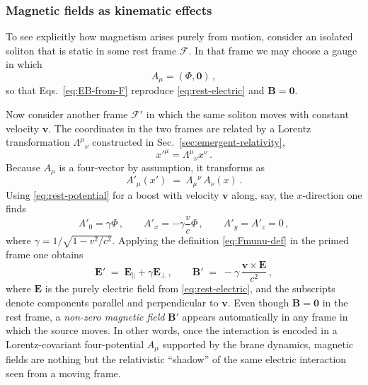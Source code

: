 \subsubsection{Magnetic fields as kinematic effects}

To see explicitly how magnetism arises purely from motion, consider an
isolated soliton that is static in some rest frame $\mathcal{F}$.
In that frame we may choose a gauge in which
\begin{equation}
  A_\mu = (\Phi, \mathbf{0})\,,
  \label{eq:rest-potential}
\end{equation}
so that Eqs.~\eqref{eq:EB-from-F} reproduce
\eqref{eq:rest-electric} and $\mathbf{B} = \mathbf{0}$.

Now consider another frame $\mathcal{F}'$ in which the same soliton
moves with constant velocity $\mathbf{v}$.
The coordinates in the two frames are related by a Lorentz
transformation $\Lambda^\mu{}_\nu$ constructed in
Sec.~\ref{sec:emergent-relativity},
\begin{equation}
  x'^\mu = \Lambda^\mu{}_\nu x^\nu\,.
\end{equation}
Because $A_\mu$ is a four-vector by assumption, it transforms as
\begin{equation}
  A'_\mu(x')
  \;=\;
  \Lambda_\mu{}^\nu\,A_\nu(x)\,.
\end{equation}
Using \eqref{eq:rest-potential} for a boost with velocity $\mathbf{v}$
along, say, the $x$-direction one finds
\begin{equation}
  A'_0 = \gamma\Phi\,,\qquad
  A'_x = -\gamma\frac{v}{c}\Phi\,,\qquad
  A'_y = A'_z = 0\,,
  \label{eq:Aprime-boost}
\end{equation}
where $\gamma = 1/\sqrt{1-v^2/c^2}$.
Applying the definition \eqref{eq:Fmunu-def} in the primed frame one
obtains
\begin{equation}
  \mathbf{E}'
  \;=\;
  \mathbf{E}_\parallel + \gamma\mathbf{E}_\perp\,,
  \qquad
  \mathbf{B}'
  \;=\;
  -\gamma\,\frac{\mathbf{v}\times\mathbf{E}}{c^2}\,,
  \label{eq:field-transform}
\end{equation}
where $\mathbf{E}$ is the purely electric field from
\eqref{eq:rest-electric}, and the subscripts denote components
parallel and perpendicular to $\mathbf{v}$.
Even though $\mathbf{B}=\mathbf{0}$ in the rest frame, a
\emph{non-zero magnetic field} $\mathbf{B}'$ appears automatically in
any frame in which the source moves.
In other words, once the interaction is encoded in a Lorentz-covariant
four-potential $A_\mu$ supported by the brane dynamics, magnetic
fields are nothing but the relativistic ``shadow'' of the same electric
interaction seen from a moving frame.


